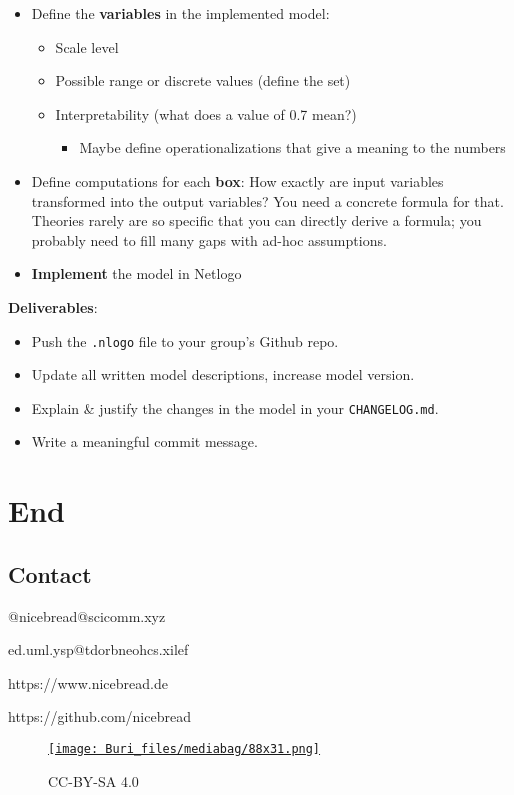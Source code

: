 \documentclass[
  letterpaper,
  DIV=11,
  numbers=noendperiod]{scrartcl}
\providecommand{\tightlist}{%
  \setlength{\itemsep}{0pt}\setlength{\parskip}{0pt}}\usepackage{longtable,booktabs,array}
\begin{document}
\begin{itemize}
\tightlist
\item
  Define the \textbf{variables} in the implemented model:

  \begin{itemize}
  \tightlist
  \item
    Scale level
  \item
    Possible range or discrete values (define the set)
  \item
    Interpretability (what does a value of 0.7 mean?)

    \begin{itemize}
    \tightlist
    \item
      Maybe define operationalizations that give a meaning to the
      numbers
    \end{itemize}
  \end{itemize}
\item
  Define computations for each \textbf{box}: How exactly are input
  variables transformed into the output variables? You need a concrete
  formula for that. Theories rarely are so specific that you can
  directly derive a formula; you probably need to fill many gaps with
  ad-hoc assumptions.
\item
  \textbf{Implement} the model in Netlogo
\end{itemize}

\textbf{Deliverables}:

\begin{itemize}
\tightlist
\item
  Push the \texttt{.nlogo} file to your group's Github repo.
\item
  Update all written model descriptions, increase model version.
\item
  Explain \& justify the changes in the model in your
  \texttt{CHANGELOG.md}.
\item
  Write a meaningful commit message.
\end{itemize}

\hypertarget{end}{%
\section{End}\label{end}}

\hypertarget{contact}{%
\subsection{Contact}\label{contact}}

@nicebread@scicomm.xyz

ed.uml.ysp@tdorbneohcs.xilef

https://www.nicebread.de

https://github.com/nicebread

\begin{figure}

{\centering 

\href{http://creativecommons.org/licenses/by-sa/4.0/}{\texttt{[image: Buri\_files/mediabag/88x31.png]}}

}

\caption{CC-BY-SA 4.0}

\end{figure}
\end{document}
